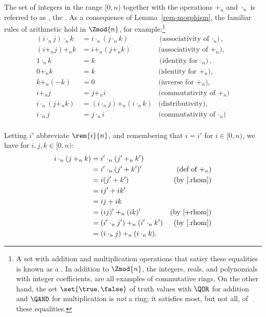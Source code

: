 The set of integers in the range $[0,n)$ together with the operations
  $+_n$ and $\cdot_n$ is referred to as , the
  .  As a consequence of
  Lemma~\ref{rem-morphism}, the familiar rules of arithmetic hold in
  $\Zmod{n}$, for example:\footnote{A set with addition and
    multiplication operations that satisy these equalities is known as
    a .  In addition to $\Zmod{n}$, the
    integers, reals, and polynomials with integer coefficients, are
    all examples of commutative rings.  On the other hand, the set
    $\set{\true, \false}$ of truth values with $\QOR$ for addition and
    $\QAND$ for multiplication is \emph{not} a ring; it satisfies
    most, but not all, of these equalities.}
\begin{align*}
(i \cdot_n j) \cdot_n k & = i \cdot_n (j \cdot_n k)
       & \text{(associativity of $\cdot_n$)},\\
        (i +_n j) +_n k & = i +_n (j +_n k)
       & \text{(associativity of $+_n$)},\\
           1 \cdot_n k  & = k
       & \text{(identity for $\cdot_n$)},\\
              0 +_n k  & = k
       & \text{(identity for $+_n$)},\\
           k +_n (-k)  & = 0
       & \text{(inverse for $+_n$)},\\
                i +_n j & = j +_n i
       & \text{(commutativity of $+_n$)}\\
    i \cdot_n (j +_n k) & = (i \cdot_n j) +_n (i \cdot_n k)
       & \text{(distributivity)},\\
            i \cdot_n j & = j \cdot_n i
       & \text{(commutativity of $\cdot_n$)}\\
\end{align*}

\begin{editingnotes}
Letting $i'$ abbreviate $\rem{i}{n}$, and remembering that $i = i'$
for $i \in [0,n)$, we have for $i,j,k \in [0,n)$:
\begin{align*}
i \cdot_n (j +_n k) & = i' \cdot_n (j' +_n k')\\
   & = i' \cdot_n (j' + k')' & \text{(def of $+_n$)}\\
   & = i (j' + k') & \text{(by~\eqref{.rhom})}\\  %
   & = i j' + i k'\\
   & = ij + ik\\
   & = (ij)' +_n (ik)' & \text{(by~\eqref{+rhom})}\\  %
   & = (i' \cdot_ n j') +_n (i' \cdot_ n k') & \text{(by~\eqref{.rhom})}\\
   & = (i \cdot_ n j) +_n (i \cdot_ n k).
\end{align*}
\end{editingnotes}

